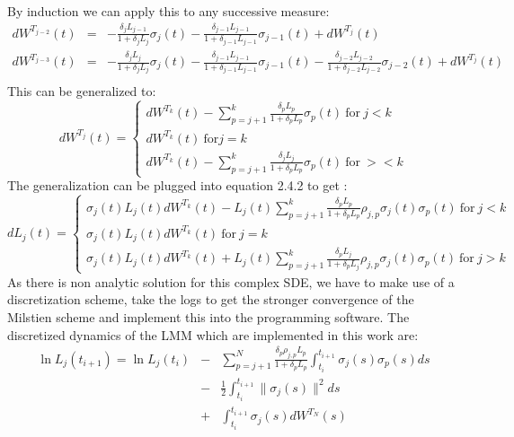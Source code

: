 \documentclass[11pt]{article}
\numberwithin{equation}{subsection}
\begin{document}
By induction we can apply this to any successive measure:
\begin{eqnarray*}
	dW^{T_{j-2}}(t) &=& -\frac{\delta_{j}L_{j-1}}{1+\delta_{j}L_{j}}\sigma_{j}(t) 
	-\frac{\delta_{j-1}L_{j-1}}{1+\delta_{j-1}L_{j-1}}\sigma_{j-1}(t)
	+ dW^{T_{j}}(t)\\
	dW^{T_{j-3}}(t) &=& -\frac{\delta_{j}L_{j}}{1+\delta_{j}L_{j}}\sigma_{j}(t) 
	-\frac{\delta_{j-1}L_{j-1}}{1+\delta_{j-1}L_{j-1}}\sigma_{j-1}(t)
	-\frac{\delta_{j-2}L_{j-2}}{1+\delta_{j-2}L_{j-2}}\sigma_{j-2}(t)
	+ dW^{T_{j}}(t)\\
\end{eqnarray*}
This can be generalized to:
\begin{displaymath}
dW^{T_j}(t) =
\left\{\begin{array}{lll}
dW^{T_{k}}(t) -\sum_{p=j+1}^{k} \frac{\delta_{p}L_{p}}{1+\delta_{p}L_{p}}\sigma_{p}(t) \ \text{for} \  j<k\\
dW^{T_{k}}(t) \ \text{for} j = k \\
dW^{T_{k}}(t) -\sum_{p=j+1}^{k} \frac{\delta_{j}L_{j}}{1+\delta_{p}L_{p}}\sigma_{p}(t)  \ \text{for} \  ><k
\end{array} \right.
\end{displaymath}
The generalization can be plugged into equation 2.4.2 to get :
\begin{displaymath}
dL_{j}(t) =
\left\{\begin{array}{lll}
\sigma_j(t) L_j(t) dW^{T_{k}}(t) - L_j(t)\sum_{p=j+1}^{k} \frac{\delta_{p}L_{p}}{1+\delta_{p}L_{p}}\rho_{j, p}\sigma_{j}(t) \sigma_{p}(t) \ \text{for} \ j<k\\
\sigma_j(t) L_j(t) dW^{T_{k}}(t) \ \text{for} \ j = k \\
\sigma_j(t) L_j(t) dW^{T_{k}}(t) + L_j(t) \sum_{p=j+1}^{k} \frac{\delta_{p}L_{j}}{1+\delta_{p}L_{j}}\rho_{j, p}\sigma_{j}(t) \sigma_{p}(t) \ \text{for} \ j>k
\end{array} \right.
\end{displaymath}
As there is non analytic solution for this complex SDE, we have to make use of a discretization scheme, take the logs to get the stronger convergence of the Milstien scheme and implement this into the programming software. The discretized dynamics of the LMM which are implemented in this work are: 
\begin{eqnarray*}
	\ln L_{j}(t_{i+1}) = \ln L_{j}(t_i) &-& \sum_{p=j+1}^{N} \frac{\delta_{p} \rho_{j, p}L_{p}} {1+\delta_{p}L_{p}} \int_{t_i}^{t_{i+1}}\sigma_{j}(s) \sigma_{p}(s) ds \\
	&-& \frac{1}{2} \int_{t_i}^{t_{i+1}} \|\sigma_{j}(s)\|^2 ds \\
	&+& \int_{t_i}^{t_{i+1}} \sigma_{j}(s) dW^{T_N}(s)
\end{eqnarray*}
\end{document}
